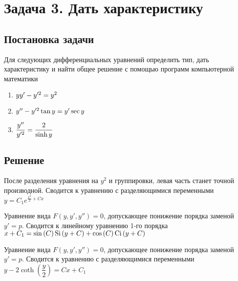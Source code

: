 

\section{Задача 3. Дать характеристику}
\subsection{Постановка задачи}
Для следующих дифференциальных уравнений определить тип, дать характеристику 
и найти общее решение с помощью программ компьютерной математики

\begin{enumerate}
	\item $ yy'-y'^2=y^2 $
	\item $ y''-y'^2\tan{y}=y'\sec{y} $
	\item $ \dfrac{y''}{y'^2}=\dfrac{2}{\sinh{y}} $
\end{enumerate}

\newpage

\subsection{Решение}
\begin{enumerate}
	\solutionItemThird
		{\equationFirst}
		{
			После разделения уравнения на $ y^2 $ и группировки, 
			левая часть станет точной производной.
		}
		{Сводится к уравнению с разделяющимися переменными}
		{$ y = C_1 e^{\tfrac{x^2}{2} + Cx} $}
	
	\vspace{1.5em}

	\solutionItemThird
		{\equationSecond}
		{
			Уравнение вида $ F(y, y', y'') = 0 $, допускающее 
			понижение порядка заменой $ y' = p $. 
		}
		{Сводится к линейному уравнению 1-го порядка}
		{$ x + C_1 = \sin{(C)} \operatorname{Si}{(y + C)} + \cos{(C)} \operatorname{Ci}{(y + C)} $}
		
	\vspace{1.5em}	
		
	\solutionItemThird
		{\equationThird}
		{ 
			Уравнение вида $ F(y, y', y'') = 0 $, допускающее
			понижение порядка заменой $ y' = p $.
		}
		{Сводится к уравнению с разделяющимися переменными}
		{$ y - 2\coth{\left(\dfrac{y}{2}\right)} = Cx + C_1 $}
\end{enumerate}
